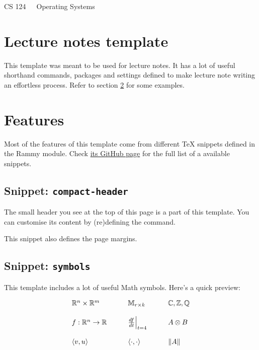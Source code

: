\documentclass{article}
\begin{document}
\begin{center}
{\LARGE CS 124~~~Operating Systems}
\vspace{10px}\\
\end{center}

\section{Lecture notes template}
This template was meant to be used for lecture notes. It has a lot of useful
shorthand commands, packages and settings defined to make lecture note writing
an effortless process. Refer to section \ref{sec:features} for some examples.


\section{Features}\label{sec:features}
Most of the features of this template come from different TeX snippets defined
in the  Rammy module. Check
\href{th://github.com/TimboKZ/latex-common}{its GitHub page} for the full list
of a available snippets.

\subsection{Snippet: \texttt{compact-header}}
The small header you see at the top of this page is a part of this template.
You can customise its content by (re)defining the  command.

This snippet also defines the page margins.


\subsection{Snippet: \texttt{symbols}}

This template includes a lot of useful Math symbols. Here's a quick preview:

\[
\begin{array}{lll}%
    \R^n \x \R^m & \qquad \M_{r \x k} \qquad & \C, \Z, \Q \\
    \\
    f: \R^n \ra \R & \qquad \frac{df}{dt}\evalat_{t=4} \qquad & A \tens B \\
    \\
    \inr{v, u} & \qquad \inner \qquad & \norm{A} \\
\end{array}
\]
\end{document}
